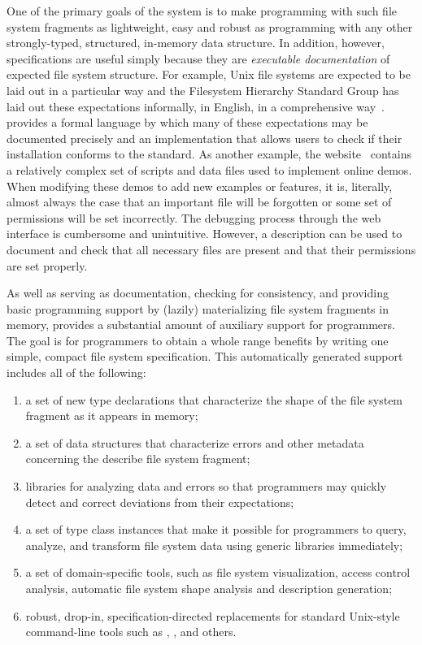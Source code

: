 One of the primary goals of the system is
to make programming with such file system fragments
as lightweight, easy and robust as programming with any other strongly-typed,
structured, in-memory \haskell{} data structure.  In addition, however,
\forest{} specifications are useful simply because they are {\em executable 
documentation} of expected file system structure.  For example, Unix file
systems are expected to be laid out in a particular way and the 
Filesystem Hierarchy Standard Group has laid out these expectations
informally, in English, in
a comprehensive way~\cite{fsh}.  \forest{} provides a formal language
by which many of these expectations may be documented precisely and
an implementation that allows users to check if their installation
conforms to the standard. As another example, the 
\pads{} website~\cite{padsweb}
contains a relatively complex set of scripts and data files used to
implement online demos.  
When modifying these demos to add new examples
or features, it is, literally, almost always the case that an important
file will be forgotten or some set of permissions will be set incorrectly.
The debugging process through the web interface is cumbersome and unintuitive.
However, a \forest{} description can be used to document and check that
all necessary files are present and that their permissions are set properly.

As well as serving as documentation, checking for consistency, and 
providing basic programming
support by (lazily) materializing file system fragments in memory, \forest{}
provides a substantial amount of auxiliary support for
programmers.  The goal is for programmers to obtain a whole range
benefits by writing one simple, compact file system specification.
This automatically generated support includes all of the following: 
\begin{enumerate}
\item a set of new type declarations that characterize
the shape of the file system fragment as it appears in memory; 
\item a set of data structures that characterize errors and other metadata
concerning the describe file system fragment;
\item libraries for analyzing
data and errors so that programmers may quickly detect
and correct deviations from their expectations;
\item a set of \haskell{} type class instances that make it possible for
programmers to query, analyze, and transform file system data using generic
libraries immediately;
\item a set of domain-specific tools, such as file system visualization,
access control analysis, automatic file system shape analysis and description
generation;
\item robust, drop-in, specification-directed replacements for standard
Unix-style command-line tools such as , ,  and
others.
\end{enumerate}

